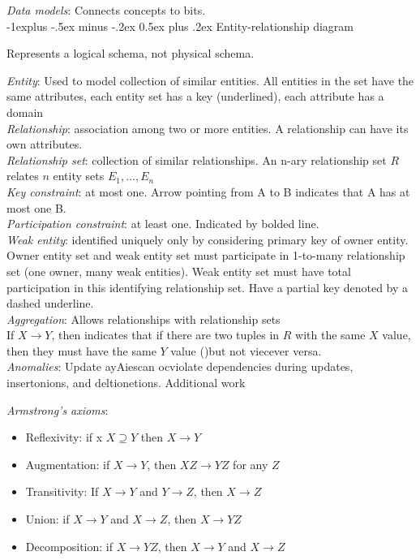 \documentclass[10pt,landscape]{article}
\makeatletter
\renewcommand{\subsection}{\@startsection{subsection}{2}{0mm}%
                                {-1explus -.5ex minus -.2ex}%
                                {0.5ex plus .2ex}%
                                {\normalfont\normalsize\bfseries}}
\makeatother
\begin{document}
\begin{multicols}{3}
\textit{Data models}: Connects concepts to bits. \\

\subsection{Entity-relationship diagram}

Represents a logical schema, not physical schema.

\textit{Entity}: Used to model collection of similar entities. All entities in the set have the same attributes, each entity set has a key (underlined), each attribute has a domain \\
\textit{Relationship}: association among two or more entities. A relationship can have its own attributes. \\
\textit{Relationship set}: collection of similar relationships. An n-ary relationship set $R$ relates $n$ entity sets $E_1, \ldots, E_n$ \\
\textit{Key constraint}: at most one. Arrow pointing from A to B indicates that A has at most one B. \\
\textit{Participation constraint}: at least one. Indicated by bolded line. \\
\textit{Weak entity}: identified uniquely only by considering primary key of owner entity. Owner entity set and weak entity set must participate in 1-to-many relationship set (one owner, many weak entities). Weak entity set must have total participation in this identifying relationship set. Have a partial key denoted by a dashed underline. \\
\textit{Aggregation}: Allows relationships with relationship sets \\

If $X \rightarrow Y$, then  indicates that if there are two tuples in $R$ with the same $X$ value, then they must have the same $Y$ value ()but not viecever versa. \\

\textit{Anomalies}: Update ayAiescan ocviolate dependencies during updates, insertonions, and deltionetions. Additional work

\textit{Armstrong's axioms}:

\begin{itemize}
  \item Reflexivity: if x $X \supseteq Y$ then $X \rightarrow Y$
  \item Augmentation: if $X \rightarrow Y$, then $XZ \rightarrow YZ$ for any $Z$
  \item Transitivity: If $X \rightarrow Y$ and $Y \rightarrow Z$, then $X \rightarrow Z$
  \item Union: if $X \rightarrow Y$ and $X \rightarrow Z$, then $X \rightarrow YZ$
  \item Decomposition: if $X \rightarrow YZ$, then $X \rightarrow Y$ and $X \rightarrow Z$
\end{itemize}


\end{multicols}
\end{document}

